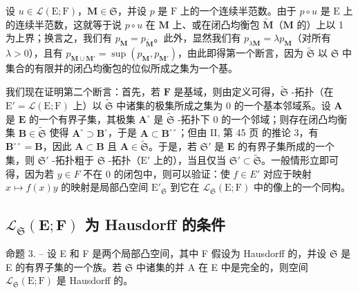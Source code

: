 设 \(u \in \mathcal{L}(\mathrm{E};\mathrm{F})\)，\(\mathbf{M} \in \mathfrak{S}\)，并设 \(p\) 是 \(\mathrm{F}\) 上的一个连续半范数。由于 \(p \circ u\) 是 \(\mathrm{E}\) 上的连续半范数，这就等于说 \(p \circ u\) 在 \(\mathbf{M}\) 上、或在闭凸均衡包 \(\tilde{\mathbf{M}}\)（\(\mathbf{M}\) 的）上以 1 为上界；换言之，我们有 \(p_{\mathbf{M}} = p_{\tilde{\mathbf{M}}}\)。此外，显然我们有 \(p_{\lambda \mathbf{M}} = \lambda p_{\mathbf{M}}\)（对所有 \(\lambda > 0\)），且有 \(p_{\mathbf{M} \cup \mathbf{M}'} = \sup(p_{\mathbf{M}}, p_{\mathbf{M}'})\)，由此即得第一个断言，因为 \(\tilde{\mathfrak{S}}\) 以 \(\mathfrak{S}\) 中集合的有限并的闭凸均衡包的位似所成之集为一个基。

我们现在证明第二个断言：首先，若 \(\mathbf{F}\) 是基域，则由定义可得，\(\tilde{\mathfrak{S}}\) -拓扑（在 \(\mathrm{E}' = \mathcal{L}(\mathrm{E};\mathrm{F})\) 上）以 \(\tilde{\mathfrak{S}}\) 中诸集的极集所成之集为 0 的一个基本邻域系。设 \(\mathbf{A}\) 是 \(\mathbf{E}\) 的一个有界子集，其极集 \(\mathbf{A}^{\circ}\) 是 \(\tilde{\mathfrak{S}}\) -拓扑下 0 的一个邻域；则存在闭凸均衡集 \(\mathbf{B} \in \tilde{\mathfrak{S}}\) 使得 \(\mathbf{A}^{\circ} \supset \mathbf{B}^{\circ}\)，于是 \(\mathbf{A} \subset \mathbf{B}^{\circ \circ}\)；但由 II, 第 45 页 的推论 3，有 \(\mathbf{B}^{\circ \circ} = \mathbf{B}\)，因此 \(\mathbf{A} \subset \mathbf{B}\) 且 \(\mathbf{A} \in \tilde{\mathfrak{S}}\)。于是，若 \(\mathfrak{S}'\) 是 \(\mathbf{E}\) 的有界子集所成的一个集，则 \(\mathfrak{S}'\) -拓扑粗于 \(\mathfrak{S}\) -拓扑（\(\mathrm{E}'\) 上的），当且仅当 \(\mathfrak{S}' \subset \tilde{\mathfrak{S}}\)。一般情形立即可得，因为若 \(y \in F\) 不在 0 的闭包中，则可以验证：使 \(f \in E'\) 对应于映射 \(x \mapsto f(x)y\) 的映射是局部凸空间 \(\mathrm{E}'_{\mathfrak{S}}\) 到它在 \(\mathcal{L}_{\mathfrak{S}}(\mathrm{E};\mathrm{F})\) 中的像上的一个同构。

\subsection{\texorpdfstring{\(\mathcal{L}_{\mathfrak{S}}(\mathbf{E};\mathbf{F})\) 为 Hausdorff 的条件}{\textbackslash mathcal\{L\}\_\{\textbackslash mathfrak\{S\}\}(\textbackslash mathbf\{E\};\textbackslash mathbf\{F\}) 为 Hausdorff 的条件}}

命题 3. -- 设 E 和 F 是两个局部凸空间，其中 F 假设为 Hausdorff 的，并设 \(\mathfrak{S}\) 是 E 的有界子集的一个族。若 \(\mathfrak{S}\) 中诸集的并 A 在 E 中是完全的，则空间 \(\mathcal{L}_{\mathfrak{S}}(\mathrm{E};\mathrm{F})\) 是 Hausdorff 的。

